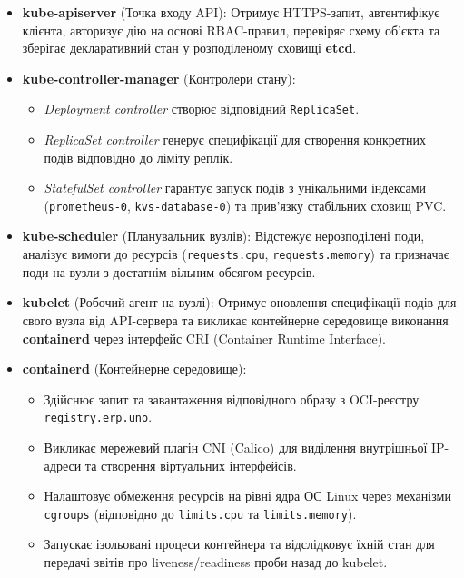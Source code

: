 \documentclass[12pt,a4paper]{article}
\begin{document}
\begin{itemize}
    \item \textbf{kube-apiserver} (Точка входу API): Отримує HTTPS-запит, автентифікує клієнта, авторизує дію на основі RBAC-правил, перевіряє схему об'єкта та зберігає декларативний стан у розподіленому сховищі \textbf{etcd}.
    \item \textbf{kube-controller-manager} (Контролери стану):
        \begin{itemize}
            \item \textit{Deployment controller} створює відповідний \texttt{ReplicaSet}.
            \item \textit{ReplicaSet controller} генерує специфікації для створення конкретних подів відповідно до ліміту реплік.
            \item \textit{StatefulSet controller} гарантує запуск подів з унікальними індексами (\texttt{prometheus-0}, \texttt{kvs-database-0}) та прив'язку стабільних сховищ PVC.
        \end{itemize}
    \item \textbf{kube-scheduler} (Планувальник вузлів): Відстежує нерозподілені поди, аналізує вимоги до ресурсів (\texttt{requests.cpu}, \texttt{requests.memory}) та призначає поди на вузли з достатнім вільним обсягом ресурсів.
    \item \textbf{kubelet} (Робочий агент на вузлі): Отримує оновлення специфікації подів для свого вузла від API-сервера та викликає контейнерне середовище виконання \textbf{containerd} через інтерфейс CRI (Container Runtime Interface).
    \item \textbf{containerd} (Контейнерне середовище):
        \begin{itemize}
            \item Здійснює запит та завантаження відповідного образу з OCI-реєстру \texttt{registry.erp.uno}.
            \item Викликає мережевий плагін CNI (Calico) для виділення внутрішньої IP-адреси та створення віртуальних інтерфейсів.
            \item Налаштовує обмеження ресурсів на рівні ядра ОС Linux через механізми \texttt{cgroups} (відповідно до \texttt{limits.cpu} та \texttt{limits.memory}).
            \item Запускає ізольовані процеси контейнера та відслідковує їхній стан для передачі звітів про liveness/readiness проби назад до kubelet.
        \end{itemize}
\end{itemize}
\end{document}
